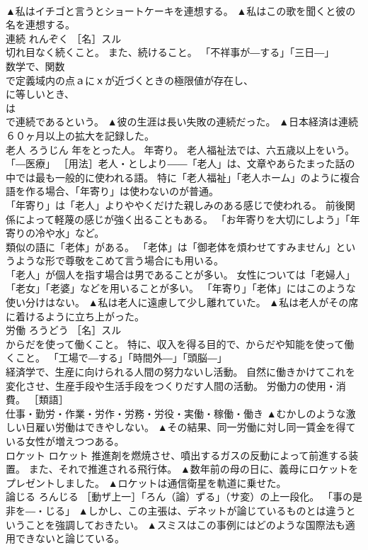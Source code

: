 \documentclass[8pt]{extreport}
\begin{document}
\begin{CJK}{UTF8}{min}
\\	▲私はイチゴと言うとショートケーキを連想する。 ▲私はこの歌を聞くと彼の名を連想する。
\\	連続	れんぞく	［名］スル 
\\	切れ目なく続くこと。 また、続けること。 「不祥事が―する」「三日―」 
\\	数学で、関数
\\	で定義域内の点ａにｘが近づくときの極限値が存在し、
\\	に等しいとき、
\\	は
\\	で連続であるという。	▲彼の生涯は長い失敗の連続だった。 ▲日本経済は連続６０ヶ月以上の拡大を記録した。
\\	老人	ろうじん	年をとった人。 年寄り。 老人福祉法では、六五歳以上をいう。 「―医療」 ［用法］老人・としより――「老人」は、文章やあらたまった話の中では最も一般的に使われる語。 特に「老人福祉」「老人ホーム」のように複合語を作る場合、「年寄り」は使わないのが普通。 
\\	「年寄り」は「老人」よりややくだけた親しみのある感じで使われる。 前後関係によって軽蔑の感じが強く出ることもある。 「お年寄りを大切にしよう」「年寄りの冷や水」など。 
\\	類似の語に「老体」がある。 「老体」は「御老体を煩わせてすみません」というような形で尊敬をこめて言う場合にも用いる。 
\\	「老人」が個人を指す場合は男であることが多い。 女性については「老婦人」「老女」「老婆」などを用いることが多い。 「年寄り」「老体」にはこのような使い分けはない。	▲私は老人に遠慮して少し離れていた。 ▲私は老人がその席に着けるように立ち上がった。
\\	労働	ろうどう	［名］スル 
\\	からだを使って働くこと。 特に、収入を得る目的で、からだや知能を使って働くこと。 「工場で―する」「時間外―」「頭脳―」 
\\	経済学で、生産に向けられる人間の努力ないし活動。 自然に働きかけてこれを変化させ、生産手段や生活手段をつくりだす人間の活動。 労働力の使用・消費。 ［類語］
\\	仕事・勤労・作業・労作・労務・労役・実働・稼働・働き	▲むかしのような激しい日雇い労働はできやしない。 ▲その結果、同一労働に対し同一賃金を得ている女性が増えつつある。
\\	ロケット	ロケット	推進剤を燃焼させ、噴出するガスの反動によって前進する装置。 また、それで推進される飛行体。	▲数年前の母の日に、義母にロケットをプレゼントしました。 ▲ロケットは通信衛星を軌道に乗せた。
\\	論じる	ろんじる	［動ザ上一］「ろん（論）ずる」（サ変）の上一段化。 「事の是非を―・じる」	▲しかし、この主張は、デネットが論じているものとは違うということを強調しておきたい。 ▲スミスはこの事例にはどのような国際法も適用できないと論じている。

\end{CJK}
\end{document}
